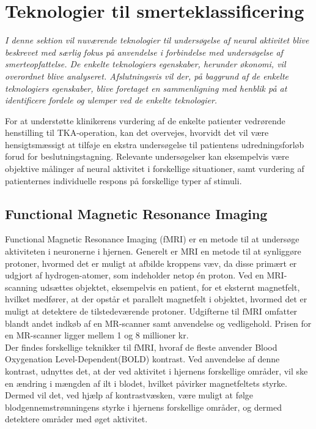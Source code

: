 \section{Teknologier til smerteklassificering} %
\textit{I denne sektion vil nuværende teknologier til undersøgelse af neural aktivitet blive beskrevet med særlig fokus på anvendelse i forbindelse med undersøgelse af smerteopfattelse. De enkelte teknologiers egenskaber, herunder økonomi, vil overordnet blive analyseret.  Afslutningsvis vil der, på baggrund af de enkelte teknologiers egenskaber, blive foretaget en sammenligning med henblik på at identificere fordele og ulemper ved de enkelte teknologier.}

For at understøtte klinikerens vurdering af de enkelte patienter vedrørende henstilling til TKA-operation, kan det overvejes, hvorvidt det vil være hensigtsmæssigt at tilføje en ekstra undersøgelse til patientens udredningsforløb forud for beslutningstagning. Relevante undersøgelser kan eksempelvis være objektive målinger af neural aktivitet i forskellige situationer, samt vurdering af patienternes individuelle respons på forskellige typer af stimuli. 


\subsection{Functional Magnetic Resonance Imaging}
Functional Magnetic Resonance Imaging (fMRI) er en metode til at undersøge aktiviteten i neuronerne i hjernen.
Generelt er MRI en metode til at synliggøre protoner, hvormed det er muligt at afbilde kroppens væv, da disse primært er udgjort af hydrogen-atomer, som indeholder netop én proton.     
Ved en MRI-scanning udsættes objektet, eksempelvis en patient, for et eksternt magnetfelt, hvilket medfører, at der opstår et parallelt magnetfelt i objektet, hvormed det er muligt at detektere de tilstedeværende protoner. \citep{Wals2009} Udgifterne til fMRI omfatter blandt andet indkøb af en MR-scanner samt anvendelse og vedligehold. Prisen for en MR-scanner ligger mellem 1 og 8 millioner kr. \citep{Glover2014}\\ 
Der findes forskellige teknikker til fMRI, hvoraf de fleste anvender Blood Oxygenation Level-Dependent(BOLD) kontrast. Ved anvendelse af denne kontrast, udnyttes det, at der ved aktivitet i hjernens forskellige områder, vil ske en ændring i mængden af ilt i blodet, hvilket påvirker magnetfeltets styrke. Dermed vil det, ved hjælp af kontrastvæsken, være muligt at følge blodgennemstrømningens styrke i hjernens forskellige områder, og dermed detektere områder med øget aktivitet. \citep{Wals2009} 


